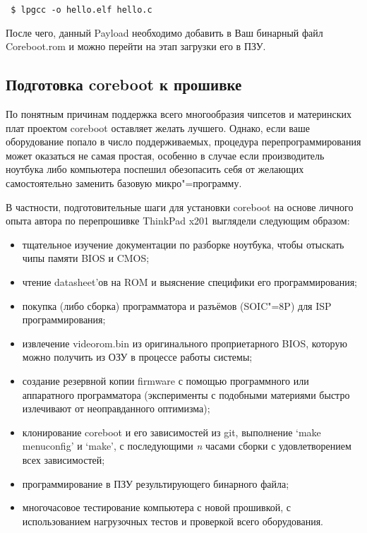 \documentclass[10pt, a5paper]{article}
\begin{document}
\verb! $ lpgcc -o hello.elf hello.c!

После чего, данный Payload необходимо добавить в Ваш бинарный файл Coreboot.rom и можно перейти на этап загрузки его в ПЗУ.

\subsection*{Подготовка coreboot к прошивке}

По понятным причинам поддержка всего многообразия чипсетов и материнских плат проектом coreboot оставляет желать лучшего. Однако, если ваше оборудование попало в число поддерживаемых, процедура перепрограммирования может оказаться не самая простая, особенно в случае если производитель ноутбука либо компьютера поспешил обезопасить себя от желающих самостоятельно заменить базовую микро"=программу.

В частности, подготовительные шаги для установки coreboot на основе личного опыта автора по перепрошивке ThinkPad x201\cite {bib4} выглядели следующим образом:

\begin{itemize}
  \item тщательное изучение документации по разборке ноутбука, чтобы отыскать чипы памяти BIOS и CMOS;
  \item чтение datasheet'ов на ROM и выяснение специфики его программирования;
  \item покупка (либо сборка) программатора и разъёмов (SOIC"=8P) для ISP программирования;
  \item извлечение videorom.bin из оригинального проприетарного \linebreak BIOS, которую можно получить из ОЗУ в процессе работы системы;
  \item создание резервной копии firmware с помощью программного или аппаратного программатора (эксперименты с подобными материями быстро излечивают от неоправданного оптимизма);
  \item клонирование coreboot и его зависимостей из git, выполнение `make menuconfig' и `make', с последующими \emph{n} часами сборки с удовлетворением всех зависимостей;
  \item программирование в ПЗУ результирующего бинарного файла;
  \item многочасовое тестирование компьютера с новой прошивкой, с использованием нагрузочных тестов и проверкой всего оборудования.
\end{itemize}
\end{document}
